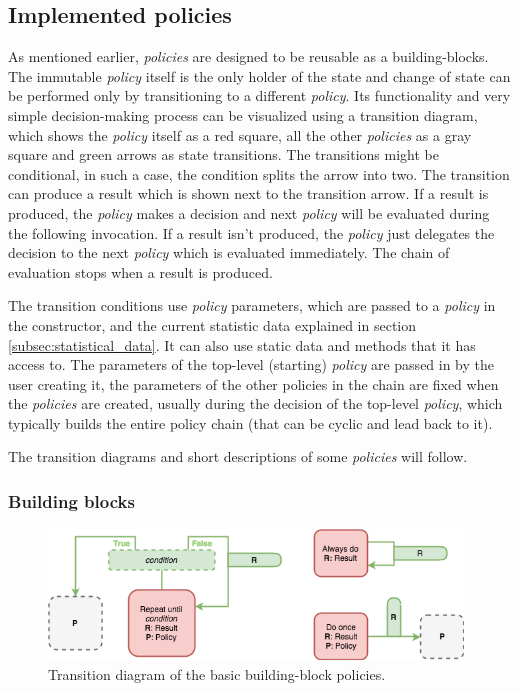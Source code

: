 \subsection{Implemented policies}

As mentioned earlier, \textit{policies} are designed to be reusable as a building-blocks. The immutable \textit{policy} itself is the only holder of the state and change of state can be performed only by transitioning to a different \textit{policy}. Its functionality and very simple decision-making process can be visualized using a transition diagram, which shows the \textit{policy} itself as a red square, all the other \textit{policies} as a gray square and green arrows as state transitions. The transitions might be conditional, in such a case, the condition splits the arrow into two. The transition can produce a result which is shown next to the transition arrow. If a result is produced, the \textit{policy} makes a decision and next \textit{policy} will be evaluated during the following invocation. If a result isn't produced, the \textit{policy} just delegates the decision to the next \textit{policy} which is evaluated immediately. The chain of evaluation stops when a result is produced.

The transition conditions use \textit{policy} parameters, which are passed to a \textit{policy} in the constructor, and the current statistic data explained in section \ref{subsec:statistical_data}. It can also use static data and methods that it has access to. The parameters of the top-level (starting) \textit{policy} are passed in by the user creating it, the parameters of the other policies in the chain are fixed when the \textit{policies} are created, usually during the decision of the top-level \textit{policy}, which typically builds the entire policy chain (that can be cyclic and lead back to it).

The transition diagrams and short descriptions of some \textit{policies} will follow.

\subsubsection{Building blocks}

\begin{figure}[h!]
	\centerline{\mbox{\includegraphics[width=110mm]{./img/helper_policies.png}}}
	\caption{Transition diagram of the basic building-block policies.}
	\label{fig:helper_policies}
\end{figure}

